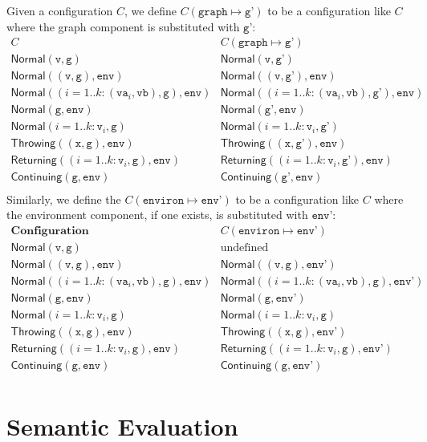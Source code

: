 \documentclass{book}
\newcommand\withgraph[2]{{#1}(\texttt{graph}\mapsto{#2})}
\newcommand\withenviron[2]{{#1}(\texttt{environ}\mapsto{#2})}
\newcommand\Normal[0]{\textsf{Normal}}
\newcommand\Throwing[0]{\textsf{Throwing}}
\newcommand\Continuing[0]{\textsf{Continuing}}
\newcommand\Returning[0]{\textsf{Returning}}
\newcommand\env[0]{\texttt{env}}
\newcommand\envp[0]{\texttt{env'}}
\newcommand\vg[0]{\texttt{g}}
\newcommand\vgp[0]{\texttt{g'}}
\newcommand\vv[0]{\texttt{v}}
\newcommand\vx[0]{\texttt{x}}
\begin{document}
Given a configuration $C$, we define $\withgraph{C}{\vgp}$ to be a configuration
like $C$ where the graph component is substituted with $\vgp$:
\[
\begin{array}{ll}
  C & \withgraph{C}{\vgp}\\
  \hline
  \Normal(\vv,\vg) & \Normal(\vv,\vgp)\\
  \Normal((\vv,\vg), \env) & \Normal((\vv,\vgp), \env)\\
  \Normal((i=1..k: (\texttt{va}_i,\texttt{vb}),\vg), \env) & \Normal((i=1..k: (\texttt{va}_i,\texttt{vb}),\vgp), \env)\\
  \Normal(\vg, \env) & \Normal(\vgp, \env)\\
  \Normal(i=1..k: \vv_i, \vg) & \Normal(i=1..k: \vv_i, \vgp)\\
  \Throwing((\vx,\vg), \env) & \Throwing((\vx,\vgp), \env)\\
  \Returning((i=1..k: \vv_i,\vg), \env) & \Returning((i=1..k: \vv_i,\vgp), \env)\\
  \Continuing(\vg, \env) & \Continuing(\vgp, \env)\\
\end{array}
\]
Similarly, we define the $\withenviron{C}{\envp}$ to be a configuration
like $C$ where the environment component, if one exists, is substituted with $\envp$:
\[
\begin{array}{ll}
  \textbf{Configuration} & \withenviron{C}{\envp}\\
  \hline
  \Normal(\vv,\vg) & \text{undefined}\\
  \Normal((\vv,\vg), \env) & \Normal((\vv,\vg), \envp)\\
  \Normal((i=1..k: (\texttt{va}_i,\texttt{vb}),\vg), \env) & \Normal((i=1..k: (\texttt{va}_i,\texttt{vb}),\vg), \envp)\\
  \Normal(\vg, \env) & \Normal(\vg, \envp)\\
  \Normal(i=1..k: \vv_i, \vg) & \Normal(i=1..k: \vv_i, \vg)\\
  \Throwing((\vx,\vg), \env) & \Throwing((\vx,\vg), \envp)\\
  \Returning((i=1..k: \vv_i,\vg), \env) & \Returning((i=1..k: \vv_i,\vg), \envp)\\
  \Continuing(\vg, \env) & \Continuing(\vg, \envp)\\
\end{array}
\]

\section{Semantic Evaluation}
\end{document}
